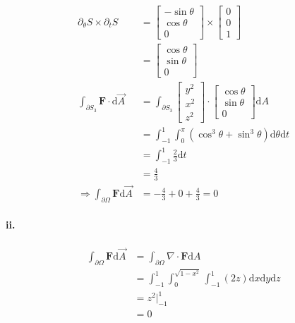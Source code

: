 \documentclass[11pt, a4paper]{article}
\begin{document}
$$\begin{aligned}
    \partial_{\theta}S \times \partial_{t}S &= 
    \begin{bmatrix}
        -\sin \theta \\
        \cos \theta \\
        0
    \end{bmatrix} \times
    \begin{bmatrix}
        0 \\
        0 \\
        1
    \end{bmatrix} \\
    &= \begin{bmatrix}
        \cos \theta \\
        \sin \theta \\
        0
    \end{bmatrix} \\
    \int_{\partial S_3} \bm{F} \cdot \mathrm{d}\vec{A} &= \int_{\partial S_3}
    \begin{bmatrix}
        y^2 \\
        x^2 \\
        z^2
    \end{bmatrix} \cdot
    \begin{bmatrix}
        \cos \theta \\
        \sin \theta \\
        0
    \end{bmatrix} \mathrm{d}A \\
    &= \int_{-1}^{1}\int_{0}^{\pi}(\cos^3 \theta + \sin^3 \theta) \mathrm{d}\theta \mathrm{d}t \\
    &= \int_{-1}^{1}\frac{2}{3}\mathrm{d}t \\
    &= \frac{4}{3} \\
    \Rightarrow \int_{\partial \Omega} \bm{F}\mathrm{d}\vec{A} &= -\frac{4}{3} + 0 + \frac{4}{3} = 0
\end{aligned}$$

\paragraph{ii.}
$$\begin{aligned}
    \int_{\partial \Omega} \bm{F}\mathrm{d}\vec{A} &= \int_{\partial \Omega} \nabla \cdot \bm{F} \mathrm{d}A \\
    &= \int_{-1}^{1}\int_{0}^{\sqrt{1-x^2}}\int_{-1}^{1} (2z) \mathrm{d}x\mathrm{d}y\mathrm{d}z \\
    &= z^2 |_{-1}^{1} \\
    &= 0
\end{aligned}$$
\end{document}
